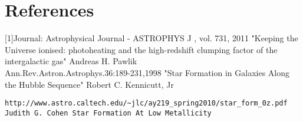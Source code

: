 \documentclass[pdf,color]{UoBnote}
\begin{document}
\section{References}

[1]Journal: Astrophysical Journal - ASTROPHYS J , vol. 731, 2011 "Keeping the Universe ionised: photoheating and the high-redshift clumping factor of the intergalactic gas" Andreas H. Pawlik \\
\newline
[2]Ann.Rev.Astron.Astrophys.36:189-231,1998 "Star Formation in Galaxies Along the Hubble Sequence" Robert C. Kennicutt, Jr \\
\newline
[3]\begin{verbatim}http://www.astro.caltech.edu/~jlc/ay219_spring2010/star_form_0z.pdf
Judith G. Cohen Star Formation At Low Metallicity\end{verbatim}
\end{document}
